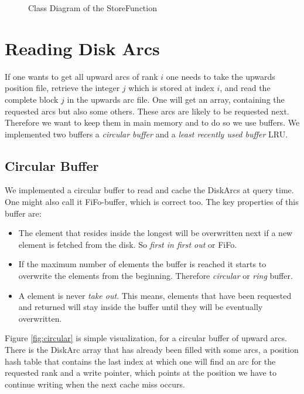 \begin{figure}
    \centering
    
    \caption{Class Diagram of the StoreFunction}
    \label{fig:store_function}
\end{figure}

\section{Reading Disk Arcs}

If one wants to get all upward arcs of rank $i$ one needs to take  the upwards position file, retrieve the integer $j$ which is stored at index $i$, and read the complete block $j$ in the upwards arc file.
One will get an array, containing the requested arcs but also some others.
These arcs are likely to be requested next.
Therefore we want to keep them in main memory and to do so we use buffers. 
We implemented two buffers a \textit{circular buffer} and a \textit{least recently used buffer} LRU.

\subsection{Circular Buffer}

We implemented a circular buffer to read and cache the DiskArcs at query time.
One might also call it FiFo-buffer, which is correct too. 
The key properties of this buffer are:

\begin{itemize}
    \item The element that resides inside the longest will be overwritten next if a new element is fetched from the disk. So \textit{first in first out} or FiFo.
    \item If the maximum number of elements the buffer is reached it starts to overwrite the elements from the beginning. Therefore \textit{circular} or \textit{ring} buffer.
    \item A element is never \textit{take out}. This means, elements that have been requested and returned will stay inside the buffer until they will be eventually overwritten. 
\end{itemize}
Figure \ref{fig:circular} is simple visualization, for a circular buffer of upward arcs.
There is the DiskArc array that has already been filled with some arcs, a position hash table that contains the last index at which one will find an arc for the requested rank and a write pointer, which points at the position we have to continue writing when the next cache miss occurs.

